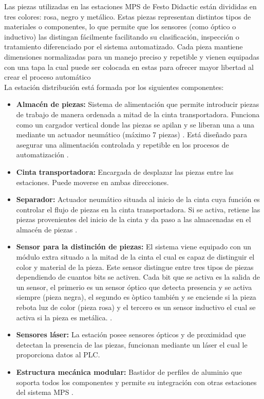 Las piezas utilizadas en las estaciones MPS de Festo Didactic están divididas en tres colores: rosa, negro y metálico. Estas piezas representan distintos tipos de materiales o componentes, lo que permite que los sensores (como óptico o inductivo) las distingan fácilmente facilitando su clasificación, inspección o tratamiento diferenciado por el sistema automatizado. Cada pieza mantiene dimensiones normalizadas para un manejo preciso y repetible y vienen equipadas con una tapa la cual puede ser colocada en estas para ofrecer mayor libertad al crear el proceso automático \\

La estación distribución está formada por los siguientes componentes:

\begin{itemize}
   \item \textbf{Almacén de piezas:} Sistema de alimentación que permite introducir piezas de trabajo de manera ordenada a mitad de la cinta transportadora. Funciona como un cargador vertical donde las piezas se apilan y se liberan una a una mediante un actuador neumático (máximo 7 piezas) \cite{estacion_distribucion}. Está diseñado para asegurar una alimentación controlada y repetible en los procesos de automatización \cite{estacion_distribucion}.
   
    \item \textbf{Cinta transportadora:} Encargada de desplazar las piezas entre las estaciones. Puede moverse en ambas direcciones. 
    
     \item \textbf{Separador:} Actuador neumático situada al inicio de la cinta cuya función es controlar el flujo de piezas en la cinta transportadora. Si se activa, retiene las piezas provenientes del inicio de la cinta y da paso a las almacenadas en el almacén de piezas \cite{estacion_distribucion}.
     
      \item \textbf{Sensor para la distinción de piezas:} El sistema viene equipado con un módulo extra situado a la mitad de la cinta el cual es capaz de distinguir el color y material de la pieza. Este sensor distingue entre tres tipos de piezas dependiendo de cuantos bits se activen. Cada bit que se activa es la salida de un sensor, el primerio es un sensor óptico que detecta presencia y se activa siempre (pieza negra), el segundo es òptico también y se enciende si la pieza rebota luz de color (pieza rosa) y el tercero es un sensor inductivo el cual se activa si la pieza es metálica. \cite{estacion_distribucion}.

    \item \textbf{Sensores láser:} La estación posee sensores ópticos y de proximidad que detectan la presencia de las piezas, funcionan mediante un láser el cual le proporciona datos al PLC.

    \item \textbf{Estructura mecánica modular:} Bastidor de perfiles de aluminio que soporta todos los componentes y permite su integración con otras estaciones del sistema MPS \cite{estacion_distribucion}.
\end{itemize}

